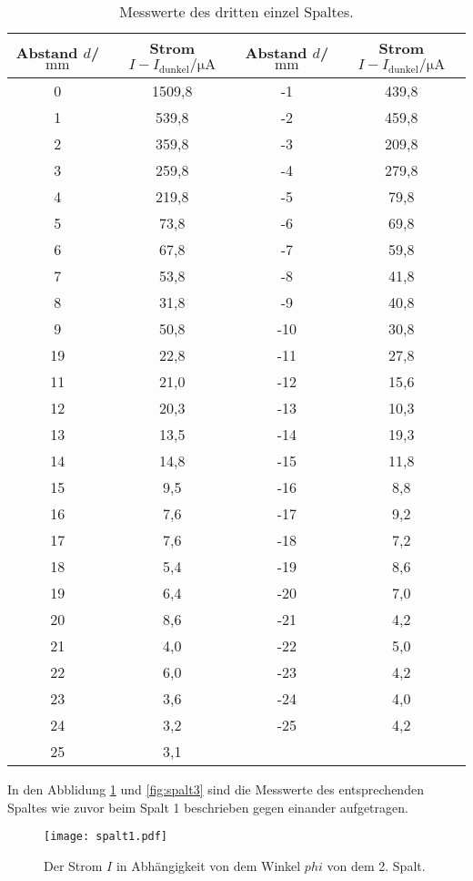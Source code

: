 \begin{table}
  \centering
  \caption{Messwerte des dritten einzel Spaltes.}
  \label{tab:spalt3}
  \begin{tabular}{c c c c}
Abstand $d$/$\si{\milli\meter}$ & Strom $I-I_\mathrm{dunkel}/\si{\micro\ampere}$&Abstand $d$/$\si{\milli\meter}$ & Strom $I-I_\mathrm{dunkel}/\si{\micro\ampere}$\\
  \midrule
  0  & 1509,8 & -1 & 439,8\\
  1  & 539,8  & -2 & 459,8\\
  2  & 359,8  & -3 & 209,8\\
  3  & 259,8  & -4 & 279,8\\
  4  & 219,8  & -5 &  79,8\\
  5  & 73,8   & -6 &  69,8\\
  6  & 67,8   & -7 &  59,8\\
  7  & 53,8   & -8 &  41,8\\
  8  & 31,8   & -9 &  40,8\\
  9  & 50,8   & -10 & 30,8\\
  19 & 22,8   & -11 & 27,8\\
  11 & 21,0   & -12 & 15,6\\
  12 & 20,3   & -13 & 10,3\\
  13 & 13,5   & -14 & 19,3\\
  14 & 14,8   & -15 & 11,8\\
  15 & 9,5    & -16 &  8,8\\
  16 & 7,6    & -17 &  9,2\\
  17 & 7,6    & -18 &  7,2\\
  18 & 5,4    & -19 &  8,6\\
  19 & 6,4    & -20 &  7,0\\
  20 & 8,6    & -21 &  4,2\\
  21 & 4,0    & -22 &  5,0\\
  22 & 6,0    & -23 &  4,2\\
  23 & 3,6    & -24 &  4,0\\
  24 & 3,2    & -25 &  4,2\\
  25 & 3,1    &     &     \\
  \bottomrule
  \end{tabular}
\end{table}


In den Abblidung \ref{fig:spalt2} und \ref{fig:spalt3} sind
die Messwerte des entsprechenden Spaltes wie zuvor beim Spalt 1 beschrieben
gegen einander aufgetragen.


\begin{figure}
  \centering
  \texttt{[image: spalt1.pdf]}
  \caption{ Der Strom $I$ in Abhängigkeit von dem Winkel $phi$ von dem 2. Spalt.}
  \label{fig:spalt2}
\end{figure}


